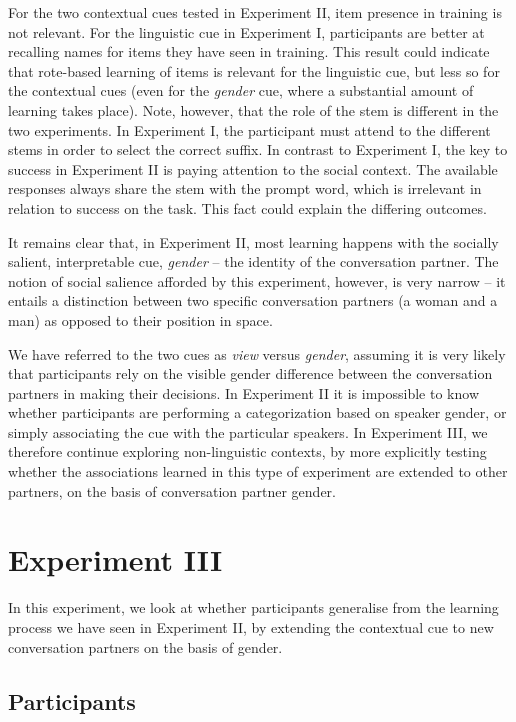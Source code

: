 \documentclass{frontiersSCNS} %
\begin{document}
For the two contextual cues tested in Experiment II, item presence in training is not relevant. For the linguistic cue in Experiment I, participants are better at recalling names for items they have seen in training. This result could indicate that rote-based learning of items is relevant for the linguistic cue, but less so for the contextual cues (even for the \emph{gender} cue, where a substantial amount of learning takes place). Note, however, that the role of the stem is different in the two experiments. In Experiment I, the participant must attend to the different stems in order to select the correct suffix. In contrast to Experiment I, the key to success in Experiment II is paying attention to the social context. The available responses always share the stem with the prompt word, which is irrelevant in relation to success on the task. This fact could explain the differing outcomes.

It remains clear that, in Experiment II, most learning happens with the socially salient, interpretable cue, \emph{gender} -- the identity of the conversation partner. The notion of social salience afforded by this experiment, however, is very narrow -- it entails a distinction between two specific conversation partners (a woman and a man) as opposed to their position in space. 


We have referred to the two cues as \emph{view} versus \emph{gender}, assuming it is very likely that participants rely on the visible gender difference between the conversation partners in making their decisions.  In Experiment II it is impossible to know whether participants are performing a categorization based on speaker gender, or simply associating the cue with the particular speakers.    In Experiment III, we therefore continue exploring non-linguistic contexts, by more explicitly testing whether the associations learned in this type of experiment are extended to other partners, on the basis of 
conversation partner gender.


\section{Experiment III}


In this experiment, we look at whether participants generalise from the learning process we have seen in Experiment II, by extending the contextual cue to new conversation partners on the basis of gender.


\subsection{Participants}
\end{document}
